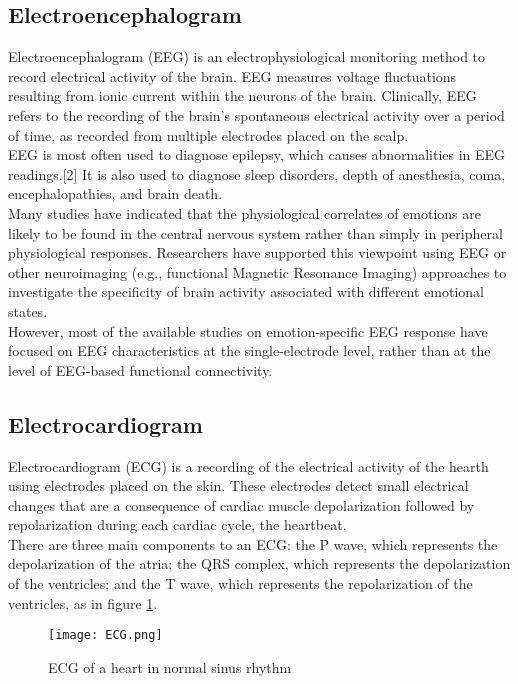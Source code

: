 \subsection{Electroencephalogram}
Electroencephalogram (EEG) is an electrophysiological monitoring method to record electrical activity of the brain. EEG measures voltage fluctuations resulting from ionic current within the neurons of the brain. Clinically, EEG refers to the recording of the brain's spontaneous electrical activity over a period of time, as recorded from multiple electrodes placed on the scalp.
\\ \indent
EEG is most often used to diagnose epilepsy, which causes abnormalities in EEG readings.[2] It is also used to diagnose sleep disorders, depth of anesthesia, coma, encephalopathies, and brain death.
\\ 
Many studies have indicated that the physiological correlates of emotions are likely to be found in the central nervous system rather than simply in peripheral physiological responses. Researchers have supported this viewpoint using EEG or other neuroimaging (e.g., functional Magnetic Resonance Imaging) approaches to investigate the specificity of brain activity associated with different emotional states.
\\
However, most of the available studies on emotion-specific EEG response have focused on EEG characteristics at the single-electrode level, rather than at the level of EEG-based functional connectivity.

\subsection{Electrocardiogram}
Electrocardiogram (ECG) is a recording of the electrical activity of the hearth using electrodes placed on the skin. These electrodes detect small electrical changes that are a consequence of cardiac muscle depolarization followed by repolarization during each cardiac cycle, the heartbeat.
\\ \indent
There are three main components to an ECG: the P wave, which represents the depolarization of the atria; the QRS complex, which represents the depolarization of the ventricles; and the T wave, which represents the repolarization of the ventricles, as in figure \ref{fig:ECG}.
\begin{figure}[h]
    \centering
    \texttt{[image: ECG.png]} 
	\caption{ECG of a heart in normal sinus rhythm}
    \label{fig:ECG}
\end{figure}

